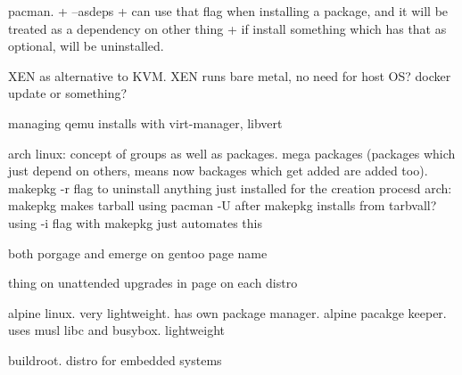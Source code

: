 pacman.
+ --asdeps
+ can use that flag when installing a package, and it will be treated as a dependency on other thing
+ if install something which has that as optional, will be uninstalled.


XEN as alternative to KVM. XEN runs bare metal, no need for host OS?
docker update or something?

managing qemu installs with virt-manager, libvert

arch linux: concept of groups as well as packages. mega packages (packages which just depend on others, means now backages which get added are added too).
makepkg -r flag to uninstall anything just installed for the creation procesd
arch: makepkg makes tarball
using pacman -U after makepkg installs from tarbvall?
using -i flag with makepkg just automates this

both porgage and emerge on gentoo page name

thing on unattended upgrades in page on each distro

alpine linux. very lightweight. has own package manager. alpine pacakge keeper. uses musl libc and busybox. lightweight

buildroot. distro for embedded systems


